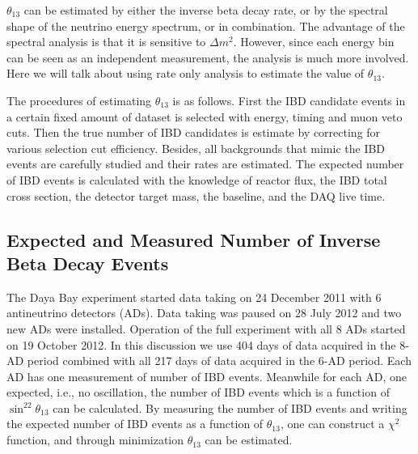 $\theta_{13}$ can be estimated by either the inverse beta decay rate, or by the spectral shape of the neutrino energy spectrum, or in combination. The advantage of the spectral analysis is that it is sensitive to $\Delta m^2$. However, since each energy bin can be seen as an independent measurement, the analysis is much more involved. Here we will talk about using rate only analysis to estimate the value of $\theta_{13}$.

The procedures of estimating $\theta_{13}$ is as follows. First the IBD candidate events in a certain fixed amount of dataset is selected with energy, timing and muon veto cuts. Then the true number of IBD candidates is estimate by correcting for various selection cut efficiency. Besides, all backgrounds that mimic the IBD events are carefully studied and their rates are estimated. The expected number of IBD events is calculated with the knowledge of reactor flux, the IBD total cross section, the detector target mass, the baseline, and the DAQ live time.

\subsection{Expected and Measured Number of Inverse Beta Decay Events}
The Daya Bay experiment started data taking on 24 December 2011 with 6 antineutrino detectors (ADs). Data taking was paused on 28 July 2012 and two new ADs were installed. Operation of the full experiment with all 8 ADs started on 19 October 2012. In this discussion we use 404 days of data acquired in the 8-AD period combined with all 217 days of data acquired in the 6-AD period. Each AD has one measurement of number of IBD events. Meanwhile for each AD, one expected, i.e., no oscillation, the number of IBD events which is a function of $\sin^22\theta_{13}$ can be calculated. By measuring the number of IBD events and writing the expected number of IBD events as a function of $\theta_{13}$, one can construct a $\chi^2$ function, and through minimization $\theta_{13}$ can be estimated.

